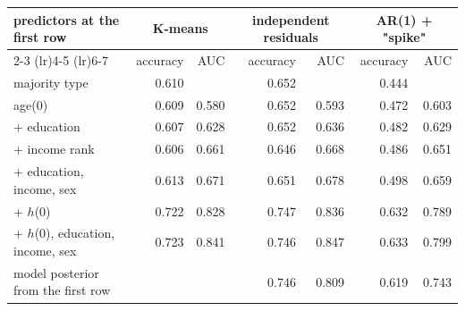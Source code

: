 \begin{tabular}{lrrrrrr}
\toprule
predictors at the first row & \multicolumn{2}{c}{K-means} & \multicolumn{2}{c}{independent residuals} & \multicolumn{2}{c}{AR(1) + "spike"} \\
\cmidrule(lr){2-3} \cmidrule(lr){4-5} \cmidrule(lr){6-7}
 & accuracy & AUC & accuracy & AUC & accuracy & AUC \\
\midrule
majority type & 0.610 &  & 0.652 &  & 0.444 &  \\
age(0) & 0.609 & 0.580 & 0.652 & 0.593 & 0.472 & 0.603 \\
+ education & 0.607 & 0.628 & 0.652 & 0.636 & 0.482 & 0.629 \\
+ income rank & 0.606 & 0.661 & 0.646 & 0.668 & 0.486 & 0.651 \\
+ education, income, sex & 0.613 & 0.671 & 0.651 & 0.678 & 0.498 & 0.659 \\
+ $h$(0) & 0.722 & 0.828 & 0.747 & 0.836 & 0.632 & 0.789 \\
+ $h$(0), education, income, sex & 0.723 & 0.841 & 0.746 & 0.847 & 0.633 & 0.799 \\
model posterior from the first row &  &  & 0.746 & 0.809 & 0.619 & 0.743 \\
\bottomrule
\end{tabular}
